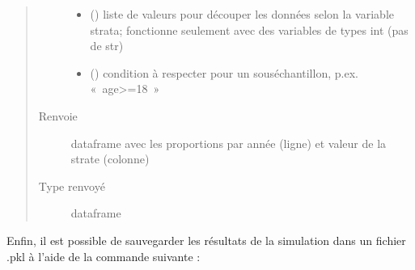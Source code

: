 \documentclass[letterpaper,10pt,french]{sphinxmanual}
\begin{document}
\begin{fulllineitems}
\begin{fulllineitems}
\begin{quote}
\begin{description}
\begin{itemize}
\item {} 
 () \textendash{} liste de valeurs pour découper les données selon la variable strata; fonctionne seulement avec des variables de types int (pas de str)

\item {} 
 () \textendash{} condition à respecter pour un sous\sphinxhyphen{}échantillon, p.ex. « age\textgreater{}=18 »

\end{itemize}

\item[{Renvoie}] \leavevmode
dataframe avec les proportions par année (ligne) et valeur de la strate (colonne)

\item[{Type renvoyé}] \leavevmode
dataframe

\end{description}\end{quote}

\end{fulllineitems}


\end{fulllineitems}


\begin{DUlineblock}{0em}
\item[] 
\end{DUlineblock}


Enfin, il est possible de sauvegarder les résultats de la simulation dans un fichier .pkl à l’aide de la commande suivante :

\begin{sphinxVerbatim}[commandchars=\\\{\}]
\end{sphinxVerbatim}

\end{document}
